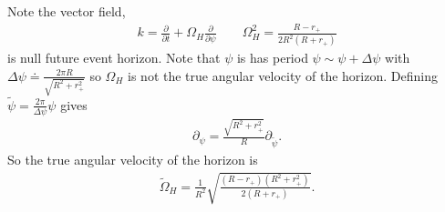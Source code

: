 \documentclass[11pt]{article}
\begin{document}
 Note the vector field, 
 \begin{eqnarray}
 k=\frac{\partial}{\partial t}+\Omega_H\frac{\partial}{\partial\psi} \qquad \Omega_H^2=\frac{R-r_+}{2R^2(R+r_+)}
 \end{eqnarray}
is null future event horizon. Note that $\psi$ is has period $\psi\sim \psi+\Delta\psi$ with $\Delta\psi\doteq\frac{2\pi R}{\sqrt{R^2+r_+^2}}$ so $\Omega_H$ is not the true angular velocity of the horizon. Defining $\tilde{\psi}=\frac{2\pi}{\Delta\psi}\psi$ gives
\begin{align}
\partial_{\psi}=\frac{\sqrt{R^2+r_+^2}}{R}\partial_{\tilde{\psi}}. 
\end{align}
So the true angular velocity of the horizon is
\begin{align}
\tilde{\Omega}_H=\frac{1}{R^2}\sqrt{\frac{(R-r_+)(R^2+r_+^2)}{2(R+r_+)}}.
\end{align}
\end{document}
